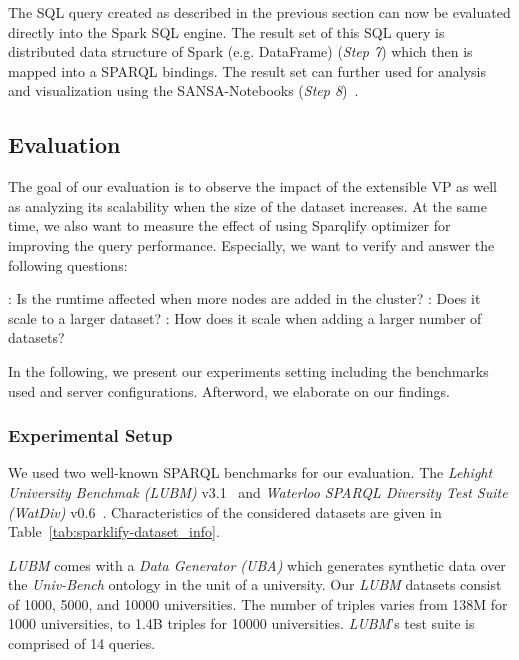 The SQL query created as described in the previous section can now be evaluated directly into the Spark SQL engine.
The result set of this SQL query is distributed data structure of Spark (e.g. DataFrame) (\textit{Step 7}) which then is mapped into a \gls{SPARQL} bindings.
The result set can further used for analysis and visualization using the SANSA-Notebooks (\textit{Step 8})~\cite{iermilov-2017-sansa-iswc-demo}.


\subsection{Evaluation}
\label{sec:sparklify-evaluation}

The goal of our evaluation is to observe the impact of the extensible VP as well as analyzing its scalability when the size of the dataset increases.
At the same time, we also want to measure the effect of using Sparqlify optimizer for improving the query performance.
Especially, we want to verify and answer the following questions:
\begin{itemize}
\addtolength{\itemindent}{1cm}
    \newitem[Q1]\label{item:Q1}: Is the runtime affected when more nodes are added in the cluster?
    \newitem[Q2]\label{item:Q2}: Does it scale to a larger dataset?
    \newitem[Q3]\label{item:Q3}: How does it scale when adding a larger number of datasets?
\end{itemize}
In the following, we present our experiments setting including the benchmarks used and server configurations. 
Afterword, we elaborate on our findings.

\subsubsection{Experimental Setup}
We used two well-known \gls{SPARQL} benchmarks for our evaluation. 
The \textit{Lehight University Benchmak (LUBM)} v3.1~\cite{Guo2005LUBMAB} and \textit{Waterloo SPARQL Diversity Test Suite (WatDiv)} v0.6~\cite{Alu2014DiversifiedST}.
Characteristics of the considered datasets are given in Table~\ref{tab:sparklify-dataset_info}.

\textit{LUBM} comes with a \textit{Data Generator (UBA)} which generates synthetic data over the \textit{Univ-Bench} ontology in the unit of a university.
Our \textit{LUBM} datasets consist of 1000, 5000, and 10000 universities.
The number of triples varies from 138M for 1000 universities, to 1.4B triples for 10000 universities.
\textit{LUBM}'s test suite is comprised of 14 queries.

